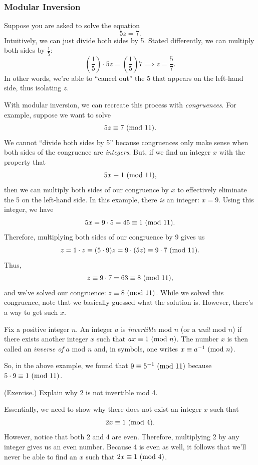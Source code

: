 \documentclass[letterpaper]{article}
\newcommand{\0}{\mathbf{0}}
\begin{document}
\subsubsection{Modular Inversion}
Suppose you are asked to solve the equation 
\[5z = 7.\]
Intuitively, we can just divide both sides by 5. Stated differently, we can multiply both sides by $\frac{1}{5}$:
\[\left(\frac{1}{5}\right) \cdot 5z = \left(\frac{1}{5}\right) 7 \implies z = \frac{5}{7}.\]
In other words, we're able to ``cancel out'' the 5 that appears on the left-hand side, thus isolating $z$. 

\bigskip 

With modular inversion, we can recreate this process with \emph{congruences}. For example, suppose we want to solve 
\[5z \equiv 7 \ (\mathrm{mod}\ 11).\]
We cannot ``divide both sides by 5'' because congruences only make sense when both sides of the congruence are \emph{integers}. But, if we find an integer $x$ with the property that 
\[5x \equiv 1 \ (\mathrm{mod}\ 11),\] 
then we can multiply both sides of our congruence by $x$ to effectively eliminate the 5 on the left-hand side. In this example, there \emph{is} an integer: $x = 9$. Using this integer, we have 
\[5x = 9 \cdot 5 = 45 \equiv 1 \ (\mathrm{mod}\ 11).\]
Therefore, multiplying both sides of our congruence by 9 gives us 
\[z = 1 \cdot z \equiv (5 \cdot 9)z = 9 \cdot (5z) \equiv 9 \cdot 7 \ (\mathrm{mod}\ 11).\]
Thus, 
\[z \equiv 9 \cdot 7 = 63 \equiv 8 \ (\mathrm{mod}\ 11),\]
and we've solved our congruence: $z \equiv 8 \ (\mathrm{mod}\ 11)$. While we solved this congruence, note that we basically guessed what the solution is. However, there's a way to get such $x$.

\begin{definition}{}{}
    Fix a positive integer $n$. An integer $a$ is \emph{invertible} mod $n$ (or a \emph{unit} mod $n$) if there exists another integer $x$ such that $ax \equiv 1 \ (\mathrm{mod}\ n)$. The number $x$ is then called an \emph{inverse of} $a$ mod $n$ and, in symbols, one writes $x \equiv a^{-1} \ (\mathrm{mod}\ n)$. 
\end{definition}
So, in the above example, we found that $9 \equiv 5^{-1} \ (\mathrm{mod}\ 11)$ because $5 \cdot 9 \equiv 1 \ (\mathrm{mod}\ 11)$. 

\begin{mdframed}
    (Exercise.) Explain why 2 is not invertible mod 4.
    \begin{mdframed}
        Essentially, we need to show why there does not exist an integer $x$ such that 
        \[2x \equiv 1 \ (\mathrm{mod}\ 4).\]
        However, notice that both 2 and 4 are even. Therefore, multiplying 2 by any integer gives us an even number. Because 4 is even as well, it follows that we'll never be able to find an $x$ such that $2x \equiv 1 \ (\mathrm{mod}\ 4)$. 
    \end{mdframed}
\end{mdframed}
\end{document}
